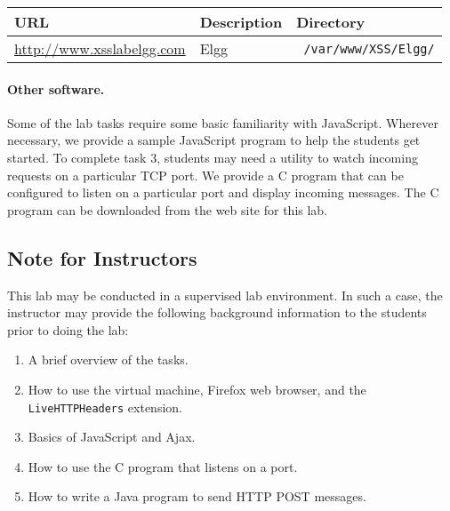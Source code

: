 \newcommand{\urlorurls}{URL }
\newcommand{\urlisorurlsare}{URL is }





\vspace{0.1in}
\begin{tabular}{|l|l|l|}
\hline
URL & Description & Directory\\
\hline
\url{http://www.xsslabelgg.com} & Elgg & {\tt
/var/www/XSS/Elgg/} \\
\hline
\end{tabular}
\vspace{0.1in}








\paragraph{Other software.}
Some of the lab tasks require some basic familiarity with
JavaScript. Wherever necessary, we provide a sample JavaScript program
to help the students get started. To complete task 3, students may
need a utility to watch incoming requests on a particular TCP port. We
provide a C program that can be configured to listen on a particular
port and display incoming messages. The C program can be downloaded 
from the web site for this lab.


\subsection{Note for Instructors} 

This lab may be conducted in a
supervised lab environment. In such a case, the instructor may provide
the following background information to the students prior to doing
the lab:
\begin{enumerate}
  \item A brief overview of the tasks.
  \item How to use the virtual machine, Firefox web browser, and the
    {\tt LiveHTTPHeaders} extension.
  \item Basics of JavaScript and Ajax.
  \item How to use the C program that listens on a port. 
  \item How to write a Java program to send HTTP POST messages. 	
\end{enumerate}

